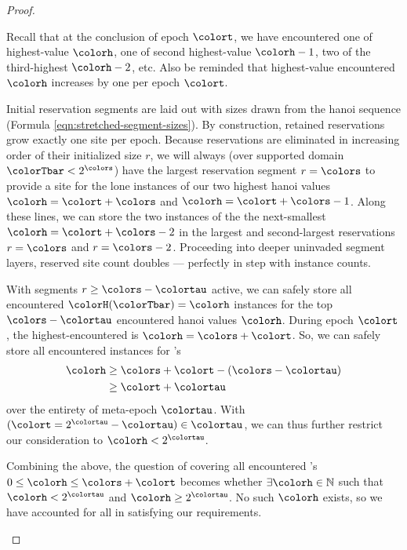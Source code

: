 \begin{proof}
\begin{proofpart}
Recall that at the conclusion of epoch $\colort$, we have encountered one of highest-value \hv{} $\colorh$, one of second highest-value \hv{} $\colorh-1$, two of the third-highest \hv{} $\colorh-2$, etc.
Also be reminded that highest-value encountered \hv{} $\colorh$ increases by one per epoch $\colort$.

Initial reservation segments are laid out with sizes drawn from the hanoi sequence (Formula \ref{eqn:stretched-segment-sizes}).
By construction, retained reservations grow exactly one site per epoch.
Because reservations are eliminated in increasing order of their initialized size $r$, we will always (over supported domain $\colorTbar < 2^{\colors}$) have the largest reservation segment $r=\colors$ to provide a site for the lone instances of our two highest hanoi values $\colorh=\colort+\colors$ and $\colorh=\colort+\colors-1$.
Along these lines, we can store the two instances of the the next-smallest \hv{} $\colorh=\colort+\colors-2$ in the largest and second-largest reservations $r=\colors$ and $r=\colors-2$.
Proceeding into deeper uninvaded segment layers, reserved site count doubles --- perfectly in step with \hv{} instance counts.

With segments $r \geq \colors - \colortau$ active, we can safely store all encountered \hv{} $\colorH(\colorTbar) = \colorh$ instances for the top $\colors - \colortau$ encountered hanoi values $\colorh$.
During epoch $\colort$, the highest-encountered \hv{} is $\colorh=\colors + \colort$.
So, we can safely store all encountered instances for \hv{}'s
\begin{align*}
\colorh
&\geq
\colors + \colort - (\colors - \colortau)\\
&\geq
\colort + \colortau
\end{align*}
over the entirety of meta-epoch $\colortau$.
With $(\colort = 2^{\colortau} - \colortau) \in \colortau$, we can thus further restrict our consideration to $\colorh < 2^{\colortau}$.
\end{proofpart}

\begin{proofpart}
Combining the above, the question of covering all encountered \hv{}'s $0\leq\colorh\leq\colors+\colort$ becomes whether $\exists \colorh \in \mathbb{N}$ such that $\colorh < 2^{\colortau}$ and $\colorh \geq 2^{\colortau}$.
No such $\colorh$ exists, so we have accounted for all \hv{} in satisfying our requirements.
\end{proofpart}

\end{proof}
